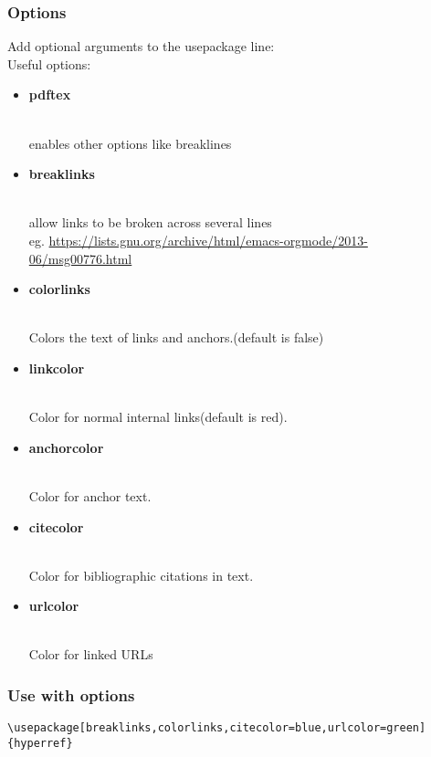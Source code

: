 \documentclass[class=book , crop=false]{standalone}
\begin{document}
\subsubsection{\Large Options}
Add optional arguments to the usepackage line:\\
Useful options:\begin{itemize}
\item \begin{large}\textbf{pdftex}\end{large}\\enables other options like breaklines
\item \begin{large}\textbf{breaklinks}\end{large}\\allow links to be broken across several lines\\eg. \url{https://lists.gnu.org/archive/html/emacs-orgmode/2013-06/msg00776.html}
\item \begin{large}\textbf{colorlinks}\end{large}\\Colors the text of links and anchors.(default is false)
\item \begin{large}\textbf{linkcolor}\end{large}\\Color for normal internal links(default is red).
\item \begin{large}\textbf{anchorcolor}\end{large}\\Color for anchor text.
\item \begin{large}\textbf{citecolor}\end{large}\\Color for bibliographic citations in text.
\item \begin{large}\textbf{urlcolor}\end{large}\\Color for linked URLs

\end{itemize}

\subsubsection{\Large Use with options}
\begin{verbatim}
\usepackage[breaklinks,colorlinks,citecolor=blue,urlcolor=green]{hyperref}
\end{verbatim}
\end{document}
